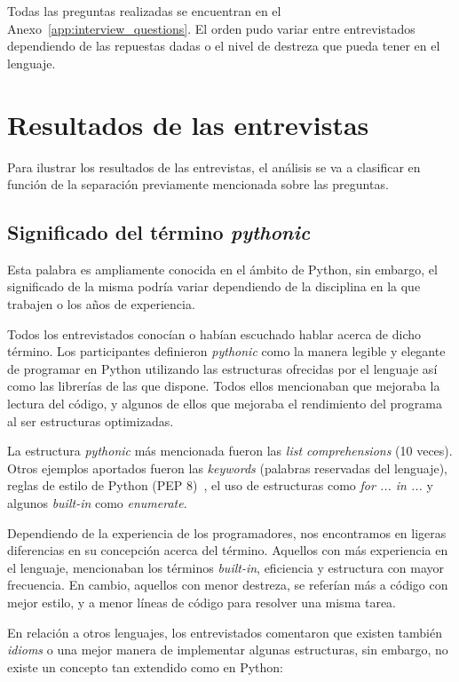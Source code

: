 \documentclass[a4paper, 12pt]{book}
\begin{document}
Todas las preguntas realizadas se encuentran en el Anexo~\ref{app:interview_questions}. El orden pudo variar entre entrevistados dependiendo de las repuestas dadas o el nivel de destreza que pueda tener en el lenguaje.


\section{Resultados de las entrevistas}


Para ilustrar los resultados de las entrevistas, el análisis se va a clasificar en función de la separación previamente mencionada sobre las preguntas.


\subsection{Significado del término \textit{pythonic}}

Esta palabra es ampliamente conocida en el ámbito de Python, sin embargo, el significado de la misma podría variar dependiendo de la disciplina en la que trabajen o los años de experiencia.

Todos los entrevistados conocían o habían escuchado hablar acerca de dicho término. Los participantes definieron \textit{pythonic} como la manera legible y elegante de programar en Python utilizando las estructuras ofrecidas por el lenguaje así como las librerías de las que dispone. Todos ellos mencionaban que mejoraba la lectura del código, y algunos de ellos que mejoraba el rendimiento del programa al ser estructuras optimizadas.

La estructura \textit{pythonic} más mencionada fueron las \textit{list comprehensions} (10 veces). Otros ejemplos aportados fueron las \textit{keywords} (palabras reservadas del lenguaje), reglas de estilo de Python (PEP 8)~\cite{van2001pep}, el uso de estructuras como \textit{for ... in ...} y algunos \textit{built-in} como \textit{enumerate}.

Dependiendo de la experiencia de los programadores, nos encontramos en ligeras diferencias en su concepción acerca del término. Aquellos con más experiencia en el lenguaje, mencionaban los términos \textit{built-in}, eficiencia y estructura con mayor frecuencia. En cambio, aquellos con menor destreza, se referían más a código con mejor estilo, y a menor líneas de código para resolver una misma tarea.

En relación a otros lenguajes, los entrevistados comentaron que existen también \textit{idioms} o una mejor manera de implementar algunas estructuras, sin embargo, no existe un concepto tan extendido como en Python:
\end{document}
